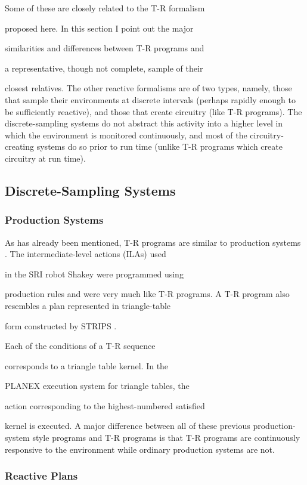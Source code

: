Some of these are closely related to the T-R formalism 

proposed here.  In this section I point out the major 

similarities and differences between T-R programs and 

a representative, though not complete, sample of their 

closest relatives.  The other reactive formalisms are of two types, namely,  
those that sample their environments at discrete intervals (perhaps rapidly  
enough to be sufficiently reactive), and those that  create circuitry (like  
T-R programs).  The discrete-sampling systems do not abstract this activity  
into a higher level in which the environment is monitored continuously, and  
most of the circuitry-creating systems do so prior to run time (unlike T-R  
programs which create circuitry at run time).

\subsection{Discrete-Sampling Systems}

\subsubsection{Production Systems} 


As has already been mentioned, T-R programs are similar to production systems  
\cite{Waterman}. The intermediate-level actions (ILAs) used 

in the SRI robot Shakey \cite{Shakey}  were programmed using 

production rules and were very much like T-R programs.  A T-R program also  
resembles a plan represented in triangle-table 

form constructed by STRIPS \cite{Fikes}.  

Each of the conditions of a T-R sequence 

corresponds to a triangle table kernel.  In the  

PLANEX execution system for triangle tables, the 

action corresponding to the highest-numbered satisfied 

kernel is executed.  A major difference between all of these previous  
production-system style
programs  and T-R programs is that T-R programs are continuously responsive  
to the environment while ordinary production systems are not.

\subsubsection{Reactive Plans} 

